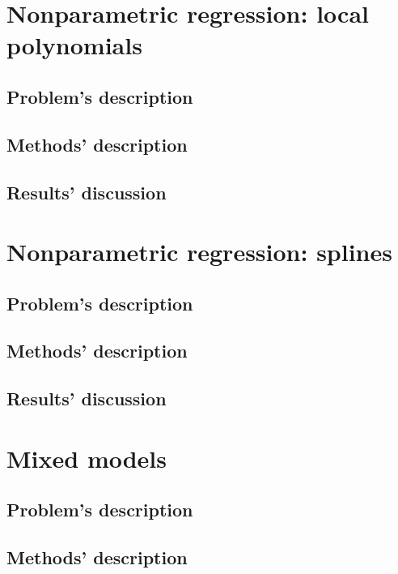 \documentclass{report}
\begin{document}

\chapter{Nonparametric regression: local polynomials}
\section{Problem's description}

\section{Methods' description}

\section{Results' discussion}


\chapter{Nonparametric regression: splines}
\section{Problem's description}

\section{Methods' description}

\section{Results' discussion}


\chapter{Mixed models}
\section{Problem's description}

\section{Methods' description}
\end{document}

